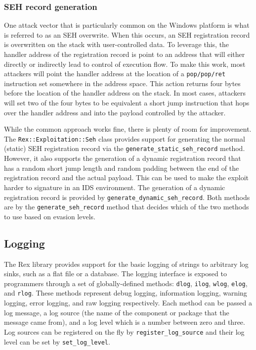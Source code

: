 \documentclass{report}
\begin{document}
            \subsubsection{SEH record generation}

\par
One attack vector that is particularly common on the Windows
platform is what is referred to as an SEH overwrite.  When this
occurs, an SEH registration record is overwritten on the stack with
user-controlled data.  To leverage this, the handler address of the
registration record is point to an address that will either directly
or indirectly lead to control of execution flow.  To make this work,
most attackers will point the handler address at the location of a
\texttt{pop/pop/ret} instruction set somewhere in the address space.
This action returns four bytes before the location of the handler
address on the stack.  In most cases, attackers will set two of the
four bytes to be equivalent a short jump instruction that hops over
the handler address and into the payload controlled by the attacker.

\par
While the common approach works fine, there is plenty of room for
improvement.  The \texttt{Rex::Exploitation::Seh} class provides
support for generating the normal (static) SEH registration record
via the \texttt{generate\_static\_seh\_record} method.  However, it
also supports the generation of a dynamic registration record that
has a random short jump length and random padding between the end of
the registration record and the actual payload.  This can be used to
make the exploit harder to signature in an IDS environment.  The
generation of a dynamic registration record is provided by
\texttt{generate\_dynamic\_seh\_record}.  Both methods are by the
\texttt{generate\_seh\_record} method that decides which of the two
methods to use based on evasion levels.

        \subsection{Logging}

\par
The Rex library provides support for the basic logging of strings to
arbitrary log sinks, such as a flat file or a database.  The logging
interface is exposed to programmers through a set of
globally-defined methods: \texttt{dlog}, \texttt{ilog},
\texttt{wlog}, \texttt{elog}, and \texttt{rlog}.  These methods
represent debug logging, information logging, warning logging, error
logging, and raw logging respectively.  Each method can be passed a
log message, a log source (the name of the component or package that
the message came from), and a log level which is a number between
zero and three.  Log sources can be registered on the fly by
\texttt{register\_log\_source} and their log level can be set by
\texttt{set\_log\_level}.
\end{document}
